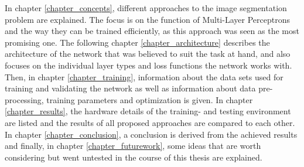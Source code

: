 \noindent In chapter \ref{chapter_concepts}, different approaches to the image segmentation problem are explained. The focus is on the function of Multi-Layer Perceptrons and the way they can be trained efficiently, as this approach was seen as the most promising one. The following chapter \ref{chapter_architecture} describes the architecture of the network that was believed to suit the task at hand, and also focuses on the individual layer types and loss functions the network works with. Then, in chapter \ref{chapter_training}, information about the data sets used for training and validating the network as well as information about data pre-processing, training parameters and optimization is given. In chapter \ref{chapter_results}, the hardware details of the training- and testing environment are listed and the results of all proposed approaches are compared to each other. In chapter \ref{chapter_conclusion}, a conclusion is derived from the achieved results and finally, in chapter \ref{chapter_futurework}, some ideas that are worth considering but went untested in the course of this thesis are explained. 